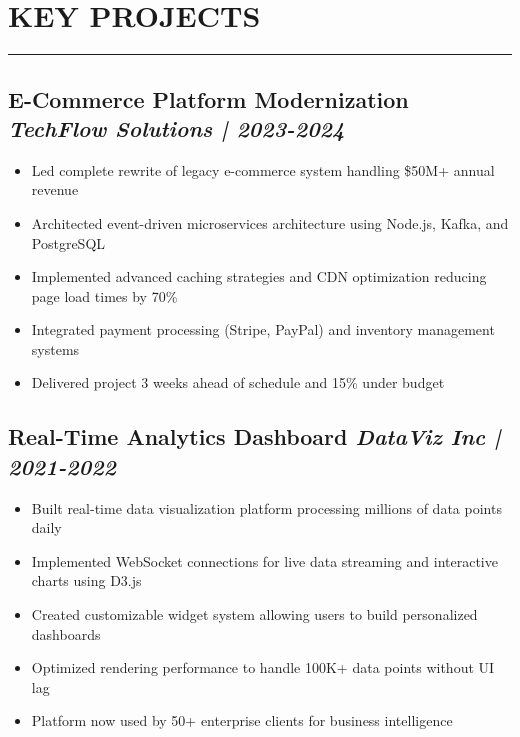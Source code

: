 \documentclass[a4paper,10pt]{article}           %
\begin{document}
    \section*{KEY PROJECTS}
    \vspace{-0.5em}
    \hrule
    \vspace{0.3cm}

    \subsection*{E-Commerce Platform Modernization \hfill \textit{TechFlow Solutions | 2023-2024}}
    \vspace{-0.5em}
    \begin{itemize}[leftmargin=0.2cm, itemsep=0pt, label=--]
        \item Led complete rewrite of legacy e-commerce system handling \$50M+ annual revenue
        \item Architected event-driven microservices architecture using Node.js, Kafka, and PostgreSQL
        \item Implemented advanced caching strategies and CDN optimization reducing page load times by 70\%
        \item Integrated payment processing (Stripe, PayPal) and inventory management systems
        \item Delivered project 3 weeks ahead of schedule and 15\% under budget
    \end{itemize}

    \subsection*{Real-Time Analytics Dashboard \hfill \textit{DataViz Inc | 2021-2022}}
    \vspace{-0.5em}
    \begin{itemize}[leftmargin=0.2cm, itemsep=0pt, label=--]
        \item Built real-time data visualization platform processing millions of data points daily
        \item Implemented WebSocket connections for live data streaming and interactive charts using D3.js
        \item Created customizable widget system allowing users to build personalized dashboards
        \item Optimized rendering performance to handle 100K+ data points without UI lag
        \item Platform now used by 50+ enterprise clients for business intelligence
    \end{itemize}
\end{document}

